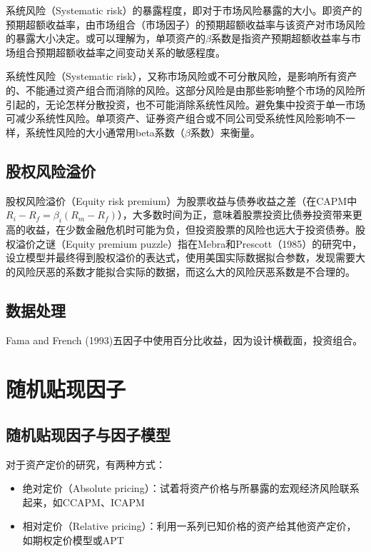 \documentclass[11pt]{article}
\begin{document}
系统风险（Systematic risk）的暴露程度，即对于市场风险暴露的大小。即资产的预期超额收益率，由市场组合（市场因子）的预期超额收益率与该资产对市场风险的暴露大小决定。或可以理解为，单项资产的$\beta$系数是指资产预期超额收益率与市场组合预期超额收益率之间变动关系的敏感程度。

系统性风险（Systematic risk），又称市场风险或不可分散风险，是影响所有资产的、不能通过资产组合而消除的风险。这部分风险是由那些影响整个市场的风险所引起的，无论怎样分散投资，也不可能消除系统性风险。避免集中投资于单一市场可减少系统性风险。单项资产、证券资产组合或不同公司受系统性风险影响不一样，系统性风险的大小通常用beta系数（$\beta$系数）来衡量。

\subsection{股权风险溢价}

股权风险溢价（Equity risk premium）为股票收益与债券收益之差（在CAPM中$R_i-R_f = \beta_i (R_m-R_f)$），大多数时间为正，意味着股票投资比债券投资带来更高的收益，在少数金融危机时可能为负，但投资股票的风险也远大于投资债券。股权溢价之谜（Equity premium puzzle）指在Mebra和Prescott（1985）的研究中，设立模型并最终得到股权溢价的表达式，使用美国实际数据拟合参数，发现需要大的风险厌恶的系数才能拟合实际的数据，而这么大的风险厌恶系数是不合理的。


\subsection{数据处理}

Fama and French (1993)五因子中使用百分比收益，因为设计横截面，投资组合。


\section{随机贴现因子}

\subsection{随机贴现因子与因子模型}

对于资产定价的研究，有两种方式：
\begin{itemize}
    \item 绝对定价（Absolute pricing）：试着将资产价格与所暴露的宏观经济风险联系起来，如CCAPM、ICAPM
    \item 相对定价（Relative pricing）：利用一系列已知价格的资产给其他资产定价，如期权定价模型或APT
\end{itemize}
\end{document}

